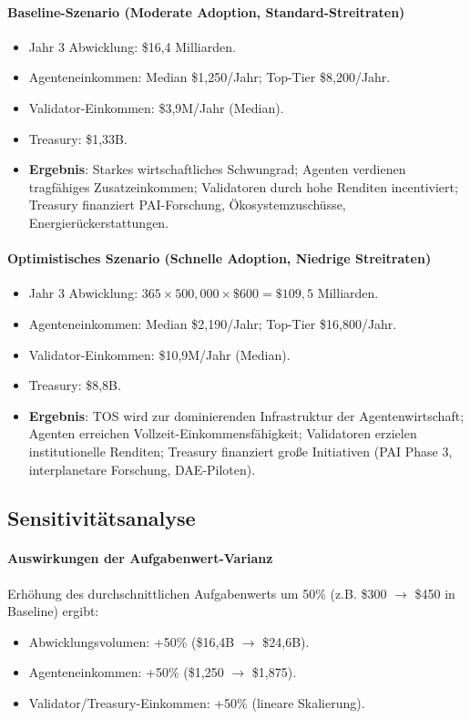 \documentclass[11pt]{article}
\begin{document}
\paragraph{Baseline-Szenario (Moderate Adoption, Standard-Streitraten)}
\begin{itemize}[noitemsep]
  \item Jahr 3 Abwicklung: \$16,4 Milliarden.
  \item Agenteneinkommen: Median \$1{,}250/Jahr; Top-Tier \$8{,}200/Jahr.
  \item Validator-Einkommen: \$3,9M/Jahr (Median).
  \item Treasury: \$1,33B.
  \item \textbf{Ergebnis}: Starkes wirtschaftliches Schwungrad; Agenten verdienen tragfähiges Zusatzeinkommen; Validatoren durch hohe Renditen incentiviert; Treasury finanziert PAI-Forschung, Ökosystemzuschüsse, Energierückerstattungen.
\end{itemize}

\paragraph{Optimistisches Szenario (Schnelle Adoption, Niedrige Streitraten)}
\begin{itemize}[noitemsep]
  \item Jahr 3 Abwicklung: $365 \times 500{,}000 \times \$600 = \$109,5$ Milliarden.
  \item Agenteneinkommen: Median \$2{,}190/Jahr; Top-Tier \$16{,}800/Jahr.
  \item Validator-Einkommen: \$10,9M/Jahr (Median).
  \item Treasury: \$8,8B.
  \item \textbf{Ergebnis}: TOS wird zur dominierenden Infrastruktur der Agentenwirtschaft; Agenten erreichen Vollzeit-Einkommensfähigkeit; Validatoren erzielen institutionelle Renditen; Treasury finanziert große Initiativen (PAI Phase 3, interplanetare Forschung, DAE-Piloten).
\end{itemize}

\subsection{Sensitivitätsanalyse}
\paragraph{Auswirkungen der Aufgabenwert-Varianz}
Erhöhung des durchschnittlichen Aufgabenwerts um 50\% (z.B. \$300 $\to$ \$450 in Baseline) ergibt:
\begin{itemize}[noitemsep]
  \item Abwicklungsvolumen: +50\% (\$16,4B $\to$ \$24,6B).
  \item Agenteneinkommen: +50\% (\$1{,}250 $\to$ \$1{,}875).
  \item Validator/Treasury-Einkommen: +50\% (lineare Skalierung).
\end{itemize}
\end{document}
